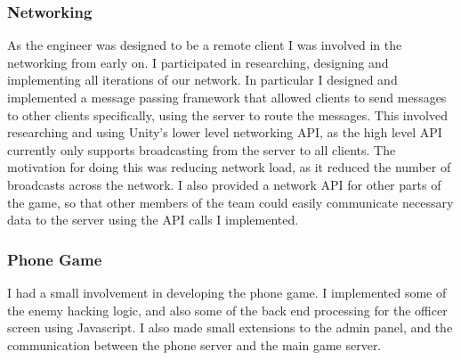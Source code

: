 \documentclass[a4paper,11pt]{article}
\begin{document}
\subsubsection{Networking}

As the engineer was designed to be a remote client I was involved in the networking from early on. I participated in researching, designing and implementing all iterations of our network. In particular I designed and implemented a message passing framework that allowed clients to send messages to other clients specifically, using the server to route the messages. This involved researching and using Unity’s lower level networking API, as the high level API currently only supports broadcasting from the server to all clients. The motivation for doing this was reducing network load, as it reduced the number of broadcasts across the network. I also provided a network API for other parts of the game, so that other members of the team could easily communicate necessary data to the server using the API calls I implemented.

\subsubsection{Phone Game}

I had a small involvement in developing the phone game. I implemented some of the enemy hacking logic, and also some of the back end processing for the officer screen using Javascript. I also made small extensions to the admin panel, and the communication between the phone server and the main game server.

\clearpage
\end{document}
